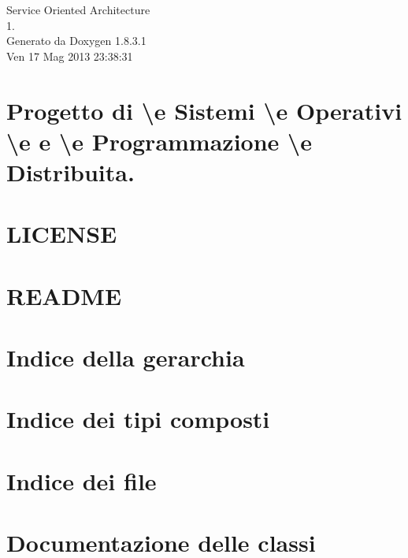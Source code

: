 \documentclass{book}
\begin{document}
\hypersetup{pageanchor=false,citecolor=blue}
\begin{titlepage}
\vspace*{7cm}
\begin{center}
{\Large Service Oriented Architecture \\[1ex]\large 1. }\\
\vspace*{1cm}
{\large Generato da Doxygen 1.8.3.1}\\
\vspace*{0.5cm}
{\small Ven 17 Mag 2013 23:38:31}\\
\end{center}
\end{titlepage}
\clearemptydoublepage
{}
\tableofcontents
\clearemptydoublepage
{}
\hypersetup{pageanchor=true,citecolor=blue}
\chapter{Progetto di \textbackslash{}e Sistemi \textbackslash{}e Operativi \textbackslash{}e e \textbackslash{}e Programmazione \textbackslash{}e Distribuita.}
\label{index}\hypertarget{index}{}
\chapter{L\-I\-C\-E\-N\-S\-E}
\label{md_LICENSE}
\hypertarget{md_LICENSE}{}

\chapter{R\-E\-A\-D\-M\-E}
\label{md_README}
\hypertarget{md_README}{}

\chapter{Indice della gerarchia}

\chapter{Indice dei tipi composti}

\chapter{Indice dei file}

\chapter{Documentazione delle classi}













\end{document}

